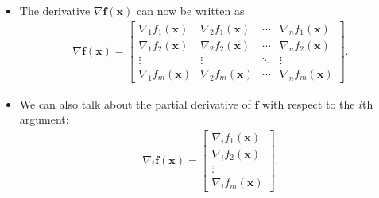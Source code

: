 \documentclass[10pt]{article}
\newcommand{\ve}[1]{\mathbf{#1}}
\begin{document}
\begin{itemize}
  \item The derivative $\nabla \ve{f}(\ve{x})$ can now be written as
  \begin{align*}
    \nabla \ve{f}(\ve{x})
    = \begin{bmatrix}
      \nabla_1 f_1(\ve{x}) & \nabla_2 f_1(\ve{x}) & \cdots & \nabla_n f_1(\ve{x}) \\
      \nabla_1 f_2(\ve{x}) & \nabla_2 f_2(\ve{x}) & \cdots & \nabla_n f_2(\ve{x}) \\
      \vdots & \vdots & \ddots & \vdots \\
      \nabla_1 f_m(\ve{x}) & \nabla_2 f_m(\ve{x}) & \cdots & \nabla_n f_m(\ve{x})
    \end{bmatrix}.
  \end{align*}

  \item We can also talk about the partial derivative of $\ve{f}$ with respect to the $i$th argument:
  \begin{align*}
    \nabla_i \ve{f}(\ve{x}) = \begin{bmatrix}
      \nabla_i f_1(\ve{x}) \\
      \nabla_i f_2(\ve{x}) \\
      \vdots \\
      \nabla_i f_m(\ve{x})
    \end{bmatrix}.
  \end{align*}


\end{itemize}
\end{document}
